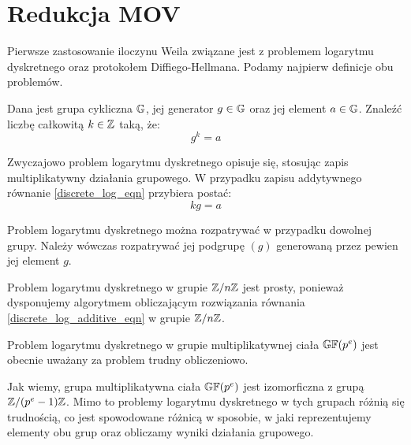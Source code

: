 \section{Redukcja MOV}

\noindent
Pierwsze zastosowanie iloczynu Weila związane jest
z problemem logarytmu dyskretnego oraz protokołem Diffiego-Hellmana.
Podamy najpierw definicje obu problemów.

\begin{problem}
Dana jest grupa cykliczna $\mathbb{G}$,
jej generator $g \in \mathbb{G}$
oraz jej element $a \in \mathbb{G}$.
Znaleźć liczbę całkowitą $k \in \mathbb{Z}$ taką, że:
\begin{equation}\label{discrete_log_eqn}
g^k = a
\end{equation}
\end{problem}

\begin{remark}
Zwyczajowo problem logarytmu dyskretnego opisuje się,
stosując zapis multiplikatywny działania grupowego.
W przypadku zapisu addytywnego równanie \ref{discrete_log_eqn}
przybiera postać:
\begin{equation}\label{discrete_log_additive_eqn}
kg = a
\end{equation}
\end{remark}

\begin{remark}
Problem logarytmu dyskretnego można rozpatrywać w przypadku dowolnej grupy.
Należy wówczas rozpatrywać jej podgrupę $(g)$
generowaną przez pewien jej element $g$.
\end{remark}

\begin{remark}
Problem logarytmu dyskretnego w grupie $\mathbb{Z} / n\mathbb{Z}$ jest prosty,
ponieważ dysponujemy algorytmem obliczającym rozwiązania
równania \ref{discrete_log_additive_eqn} w grupie $\mathbb{Z} / n\mathbb{Z}$.
\end{remark}

\begin{remark}
Problem logarytmu dyskretnego w grupie multiplikatywnej ciała $\mathbb{GF}(p^e)$
jest obecnie uważany za problem trudny obliczeniowo.
\end{remark}

\noindent
Jak wiemy, grupa multiplikatywna ciała $\mathbb{GF}(p^e)$
jest izomorficzna z grupą $\mathbb{Z} / (p^e-1)\mathbb{Z}$.
Mimo to problemy logarytmu dyskretnego w tych grupach
różnią się trudnością,
co jest spowodowane różnicą w sposobie,
w jaki reprezentujemy elementy obu grup
oraz obliczamy wyniki działania grupowego.

